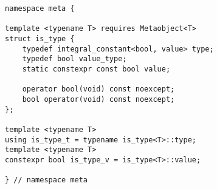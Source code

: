
\begin{verbatim}
namespace meta {

template <typename T> requires Metaobject<T>
struct is_type {
	typedef integral_constant<bool, value> type;
	typedef bool value_type;
	static constexpr const bool value;

	operator bool(void) const noexcept;
	bool operator(void) const noexcept;
};

template <typename T>
using is_type_t = typename is_type<T>::type;
template <typename T>
constexpr bool is_type_v = is_type<T>::value;

} // namespace meta
\end{verbatim}
